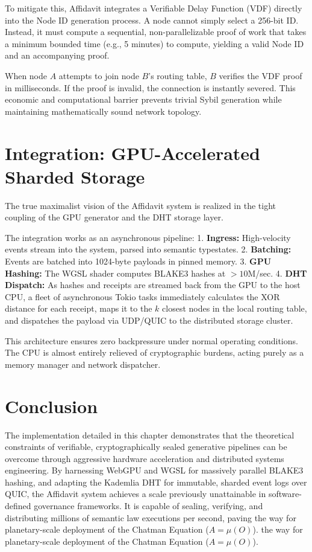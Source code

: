 To mitigate this, Affidavit integrates a Verifiable Delay Function (VDF) directly into the Node ID generation process. A node cannot simply select a 256-bit ID. Instead, it must compute a sequential, non-parallelizable proof of work that takes a minimum bounded time (e.g., 5 minutes) to compute, yielding a valid Node ID and an accompanying proof.

When node $A$ attempts to join node $B$'s routing table, $B$ verifies the VDF proof in milliseconds. If the proof is invalid, the connection is instantly severed. This economic and computational barrier prevents trivial Sybil generation while maintaining mathematically sound network topology.

\section{Integration: GPU-Accelerated Sharded Storage}

The true maximalist vision of the Affidavit system is realized in the tight coupling of the GPU generator and the DHT storage layer. 

The integration works as an asynchronous pipeline:
1. \textbf{Ingress:} High-velocity events stream into the system, parsed into semantic typestates.
2. \textbf{Batching:} Events are batched into 1024-byte payloads in pinned memory.
3. \textbf{GPU Hashing:} The WGSL shader computes BLAKE3 hashes at $>10$M/sec.
4. \textbf{DHT Dispatch:} As hashes and receipts are streamed back from the GPU to the host CPU, a fleet of asynchronous Tokio tasks immediately calculates the XOR distance for each receipt, maps it to the $k$ closest nodes in the local routing table, and dispatches the payload via UDP/QUIC to the distributed storage cluster.

This architecture ensures zero backpressure under normal operating conditions. The CPU is almost entirely relieved of cryptographic burdens, acting purely as a memory manager and network dispatcher. 

\section{Conclusion}

The implementation detailed in this chapter demonstrates that the theoretical constraints of verifiable, cryptographically sealed generative pipelines can be overcome through aggressive hardware acceleration and distributed systems engineering. By harnessing WebGPU and WGSL for massively parallel BLAKE3 hashing, and adapting the Kademlia DHT for immutable, sharded event logs over QUIC, the Affidavit system achieves a scale previously unattainable in software-defined governance frameworks. It is capable of sealing, verifying, and distributing millions of semantic law executions per second, paving the way for planetary-scale deployment of the Chatman Equation ($A = \mu(O)$).
the way for planetary-scale deployment of the Chatman Equation ($A = \mu(O)$).
